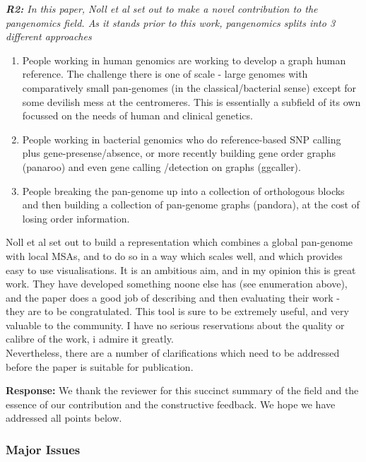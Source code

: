 \documentclass[aps,rmp,onecolumn]{revtex4-1}
\newcommand{\reviewer}[2]{{\it \textbf{#1:} #2\vskip 5mm}}
\newcommand{\response}[1]{{{\color{response}\textbf{Response:} #1}}\vskip 5mm}
\begin{document}
\reviewer{R2}{In this paper, Noll et al set out to make a novel contribution to the pangenomics field. As it stands prior to this work, pangenomics splits into 3 different approaches

      \begin{enumerate}
            \item People working in human genomics are working to develop a graph human reference. The challenge there is one of scale - large genomes with comparatively small pan-genomes (in the classical/bacterial sense) except for some devilish mess at the centromeres. This is essentially a subfield of its own focussed on the needs of human and clinical genetics.

            \item People working in bacterial genomics who do reference-based SNP calling plus gene-presense/absence, or more recently building gene order graphs (panaroo) and even gene calling /detection on graphs (ggcaller).

            \item People breaking the pan-genome up into a collection of orthologous blocks and then building a collection of pan-genome graphs (pandora), at the cost of losing order information.
      \end{enumerate}


      Noll et al set out to build a representation which combines a global pan-genome with local MSAs, and to do so in a way which scales well, and which provides easy to use visualisations. It is an ambitious aim, and in my opinion this is great work. They have developed something noone else has (see enumeration above), and the paper does a good job of describing and then evaluating their work - they are to be congratulated. This tool is sure to be extremely useful, and very valuable to the community. I have no serious reservations about the quality or calibre of the work, i admire it greatly.\\

      Nevertheless, there are a number of clarifications which need to be addressed before the paper is suitable for publication.}

\response{We thank the reviewer for this succinct summary of the field and the essence of our contribution and the constructive feedback. We hope we have addressed all points below. }

\subsubsection*{Major Issues}
\end{document}
